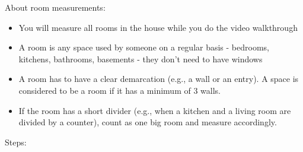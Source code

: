 \documentclass[
]{book}
\providecommand{\tightlist}{%
  \setlength{\itemsep}{0pt}\setlength{\parskip}{0pt}}
\begin{document}
About room measurements:

\begin{itemize}
\tightlist
\item
  You will measure all rooms in the house while you do the video walkthrough\\
\item
  A room is any space used by someone on a regular basis - bedrooms, kitchens, bathrooms, basements - they don't need to have windows\\
\item
  A room has to have a clear demarcation (e.g., a wall or an entry). A space is considered to be a room if it has a minimum of 3 walls.
\item
  If the room has a short divider (e.g., when a kitchen and a living room are divided by a counter), count as one big room and measure accordingly.
\end{itemize}

Steps:
\end{document}
